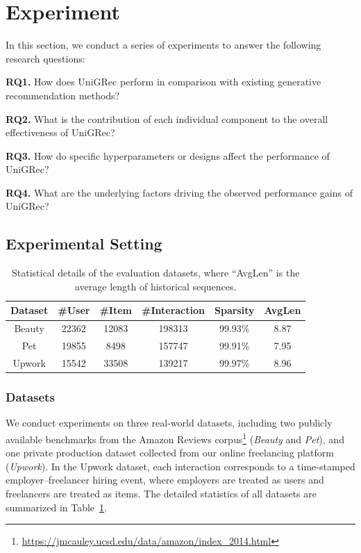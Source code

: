 \section{Experiment}
\label{sec:experiments}

In this section, we conduct a series of experiments to answer the following research questions:

\noindent \textbf{RQ1.} How does UniGRec perform in comparison with existing generative recommendation methods?

\noindent \textbf{RQ2.} What is the contribution of each individual component to the overall effectiveness of UniGRec?

\noindent \textbf{RQ3.} How do specific hyperparameters or designs affect the performance of UniGRec?

\noindent \textbf{RQ4.} What are the underlying factors driving the observed performance gains of UniGRec?

\subsection{Experimental Setting}

\begin{table}[t]
\caption{Statistical details of the evaluation datasets, where “AvgLen” is the average length of historical sequences. }
\label{table:datasets}
\begin{tabular}{cccccc}
\hline
Dataset       & \#User & \#Item & \#Interaction & Sparsity & AvgLen \\ \hline
Beauty        & 22362  & 12083  & 198313        & 99.93\%  & 8.87 \\
Pet           & 19855  & 8498   & 157747        & 99.91\%  & 7.95 \\
Upwork        & 15542  & 33508  & 139217        & 99.97\%  & 8.96 \\ \hline
\end{tabular}
\end{table}

\subsubsection{Datasets}

We conduct experiments on three real-world datasets, including two publicly available benchmarks from the Amazon Reviews corpus\footnote{\url{https://jmcauley.ucsd.edu/data/amazon/index_2014.html}} (\textit{Beauty} and \textit{Pet}), and one private production dataset collected from our online freelancing platform (\textit{Upwork}). In the Upwork dataset, each interaction corresponds to a time-stamped employer–freelancer hiring event, where employers are treated as users and freelancers are treated as items. The detailed statistics of all datasets are summarized in Table~\ref{table:datasets}.

